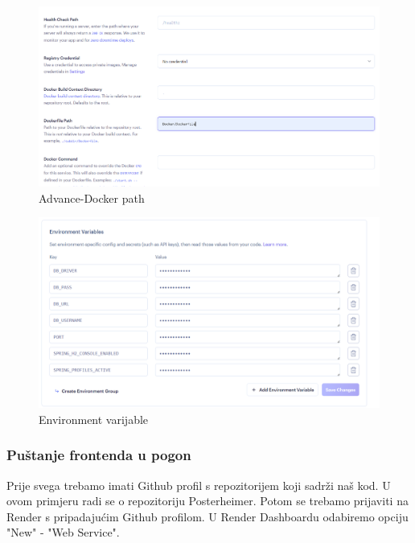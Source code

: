 			\newpage
			\begin{figure} [h]
				\includegraphics[width=\linewidth]{Slike/Advance-Docker path}
				\caption{Advance-Docker path}
			\end{figure}
			\newpage
			\begin{figure} [h]
				\includegraphics[width=\linewidth]{Slike/Environment varijable}
				\caption{Environment varijable }
			\end{figure}
			
			\subsubsection{Puštanje frontenda u pogon}
			Prije svega trebamo imati Github profil s repozitorijem koji sadrži naš kod. U ovom primjeru radi se o repozitoriju Posterheimer. Potom se trebamo prijaviti na Render s pripadajućim Github profilom. U Render Dashboardu odabiremo opciju "New" - "Web Service". 
			
